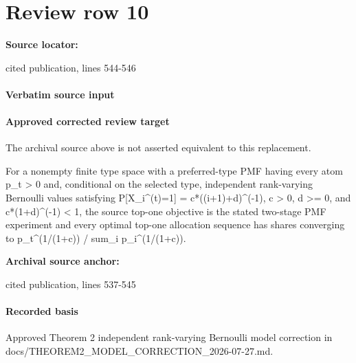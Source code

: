 \documentclass[10pt]{article}
\begin{document}
\section*{Review row 10}
\textbf{Source locator:} {\footnotesize\raggedright cited publication, lines 544-\allowbreak{}546\par}
\paragraph{Verbatim source input}
\begin{ReviewVerbatim}
\end{ReviewVerbatim}

\paragraph{Approved corrected review target}
The archival source above is not asserted equivalent to this replacement.
\begin{ReviewVerbatim}
For a nonempty finite type space with a preferred-type PMF having every atom p_t > 0 and, conditional on the selected type, independent rank-varying Bernoulli values satisfying P[X_i^(t)=1] = c*((i+1)+d)^(-1), c > 0, d >= 0, and c*(1+d)^(-1) < 1, the source top-one objective is the stated two-stage PMF experiment and every optimal top-one allocation sequence has shares converging to p_t^(1/(1+c)) / sum_i p_i^(1/(1+c)).
\end{ReviewVerbatim}

\textbf{Archival source anchor:} {\footnotesize\raggedright cited publication, lines 537-\allowbreak{}545\par}
\paragraph{Recorded basis}
Approved Theorem 2 independent rank-\allowbreak{}varying Bernoulli model correction in docs/\allowbreak{}THEOREM2\_\allowbreak{}MODEL\_\allowbreak{}CORRECTION\_\allowbreak{}2026-\allowbreak{}07-\allowbreak{}27.\allowbreak{}md.\allowbreak{}
\end{document}
